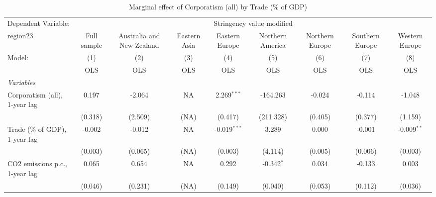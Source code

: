 
\begin{table}[htbp]
   \caption{Marginal effect of Corporatism (all) by Trade (\% of GDP)}
   \centering
   \begin{tabular}{lcccccccc}
      \toprule
      Dependent Variable: & \multicolumn{8}{c}{Stringency value modified}\\
      region23                                                       & Full sample   & Australia and New Zealand & Eastern Asia & Eastern Europe & Northern America & Northern Europe & Southern Europe & Western Europe \\   
      Model:                                                         & (1)           & (2)                       & (3)          & (4)            & (5)              & (6)             & (7)             & (8)\\  
                                                                     &  OLS          & OLS                       & OLS          & OLS            & OLS              & OLS             & OLS             & OLS\\  
      \midrule
      \emph{Variables}\\
      Corporatism (all), 1-year lag                                  & 0.197         & -2.064                    & NA           & 2.269$^{***}$  & -164.263         & -0.024          & -0.114          & -1.048\\   
                                                                     & (0.318)       & (2.509)                   & (NA)         & (0.417)        & (211.328)        & (0.405)         & (0.377)         & (1.159)\\   
      Trade (\% of GDP), 1-year lag                                  & -0.002        & -0.012                    & NA           & -0.019$^{***}$ & 3.289            & 0.000           & -0.001          & -0.009$^{**}$\\   
                                                                     & (0.003)       & (0.065)                   & (NA)         & (0.003)        & (4.114)          & (0.005)         & (0.006)         & (0.003)\\   
      CO2 emissions p.c., 1-year lag                                 & 0.065         & 0.654                     & NA           & 0.292          & -0.342$^{*}$     & 0.034           & -0.133          & 0.003\\   
                                                                     & (0.046)       & (0.231)                   & (NA)         & (0.149)        & (0.040)          & (0.053)         & (0.112)         & (0.036)\\   

\end{tabular}
\end{table}
